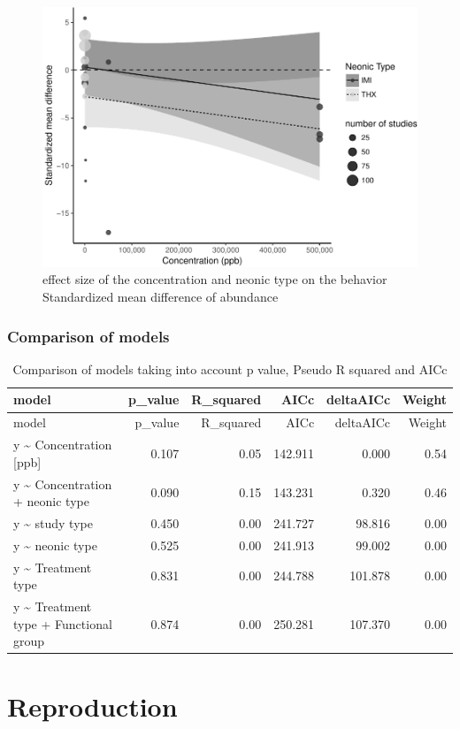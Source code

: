 \documentclass[]{elsarticle} %
\makeatletter
\def\maxwidth{\ifdim\Gin@nat@width>\linewidth\linewidth
\else\Gin@nat@width\fi}
\let\Oldincludegraphics\includegraphics
\renewcommand{\includegraphics}[1]{\Oldincludegraphics[width=\maxwidth]{#1}}
\makeatother
\begin{document}
\begin{figure}[htbp]
\centering
\includegraphics{MetanalysisNeonics2_files/figure-latex/unnamed-chunk-21-1.pdf}
\caption{effect size of the concentration and neonic type on the
behavior Standardized mean difference of abundance}
\end{figure}

\subsubsection{Comparison of models}\label{comparison-of-models-1}

\begin{longtable}[c]{@{}lrrrrr@{}}
\caption{Comparison of models taking into account p value, Pseudo R
squared and AICc}\tabularnewline
\toprule
model & p\_value & R\_squared & AICc & deltaAICc & Weight\tabularnewline
\midrule
\endfirsthead
\toprule
model & p\_value & R\_squared & AICc & deltaAICc & Weight\tabularnewline
\midrule
\endhead
y \textasciitilde{} Concentration {[}ppb{]} & 0.107 & 0.05 & 142.911 &
0.000 & 0.54\tabularnewline
y \textasciitilde{} Concentration + neonic type & 0.090 & 0.15 & 143.231
& 0.320 & 0.46\tabularnewline
y \textasciitilde{} study type & 0.450 & 0.00 & 241.727 & 98.816 &
0.00\tabularnewline
y \textasciitilde{} neonic type & 0.525 & 0.00 & 241.913 & 99.002 &
0.00\tabularnewline
y \textasciitilde{} Treatment type & 0.831 & 0.00 & 244.788 & 101.878 &
0.00\tabularnewline
y \textasciitilde{} Treatment type + Functional group & 0.874 & 0.00 &
250.281 & 107.370 & 0.00\tabularnewline
\bottomrule
\end{longtable}

\section{Reproduction}\label{reproduction}
\end{document}
